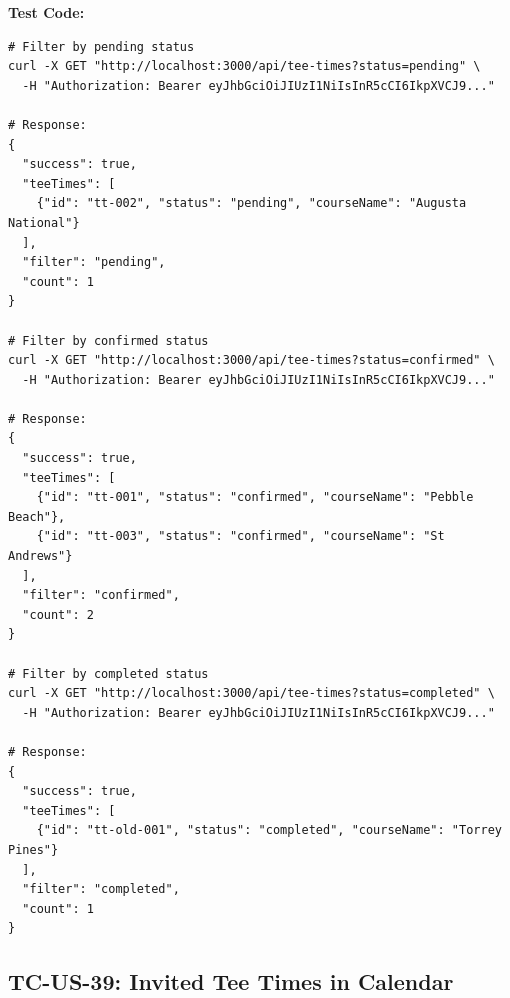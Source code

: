 \documentclass[11pt,a4paper]{article}
\begin{document}
\vspace{0.3cm}
\textbf{Test Code:}
\begin{lstlisting}
# Filter by pending status
curl -X GET "http://localhost:3000/api/tee-times?status=pending" \
  -H "Authorization: Bearer eyJhbGciOiJIUzI1NiIsInR5cCI6IkpXVCJ9..."

# Response:
{
  "success": true,
  "teeTimes": [
    {"id": "tt-002", "status": "pending", "courseName": "Augusta National"}
  ],
  "filter": "pending",
  "count": 1
}

# Filter by confirmed status
curl -X GET "http://localhost:3000/api/tee-times?status=confirmed" \
  -H "Authorization: Bearer eyJhbGciOiJIUzI1NiIsInR5cCI6IkpXVCJ9..."

# Response:
{
  "success": true,
  "teeTimes": [
    {"id": "tt-001", "status": "confirmed", "courseName": "Pebble Beach"},
    {"id": "tt-003", "status": "confirmed", "courseName": "St Andrews"}
  ],
  "filter": "confirmed",
  "count": 2
}

# Filter by completed status
curl -X GET "http://localhost:3000/api/tee-times?status=completed" \
  -H "Authorization: Bearer eyJhbGciOiJIUzI1NiIsInR5cCI6IkpXVCJ9..."

# Response:
{
  "success": true,
  "teeTimes": [
    {"id": "tt-old-001", "status": "completed", "courseName": "Torrey Pines"}
  ],
  "filter": "completed",
  "count": 1
}
\end{lstlisting}

\vspace{0.5cm}


\subsection{TC-US-39: Invited Tee Times in Calendar}
\end{document}
